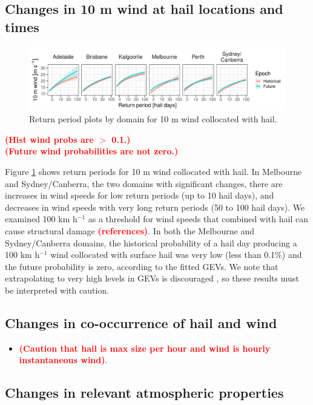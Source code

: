 \documentclass[]{agujournal2019}\usepackage[]{graphicx}\usepackage[]{xcolor}
\newcommand*{\todo}[1]{\textbf{\textcolor{red}{(#1)}}}
\begin{document}
\subsection{Changes in 10 m wind at hail locations and times}

\begin{figure}[!ht]
      \includegraphics[width=\textwidth]{figures/return_periods_wind}
      \caption{Return period plots by domain for 10 m wind collocated with hail.}
      \label{fig:return_periods_wind}
\end{figure}

\noindent\todo{Hist wind probs are $>$ 0.1.}\\\noindent\todo{Future wind probabilities are not zero.}

Figure \ref{fig:return_periods_wind} shows return periods for 10 m wind collocated with hail. In Melbourne and Sydney/Canberra, the two domains with significant changes, there are increases in wind speeds for low return periods (up to 10 hail days), and decreases in wind speeds with very long return periods (50 to 100 hail days). We examined 100 km h$^{-1}$ as a threshold for wind speeds that combined with hail can cause structural damage \todo{references}. In both the Melbourne and Sydney/Canberra domains, the historical probability of a hail day producing a 100 km h$^{-1}$ wind collocated with surface hail was very low (less than 0.1\%) and the future probability is zero, according to the fitted GEVs. We note that extrapolating to very high levels in GEVs is discouraged \cite{Coles_2001}, so these results must be interpreted with caution.

\subsection{Changes in co-occurrence of hail and wind}

\begin{itemize}
\item \todo{Caution that hail is max size per hour and wind is hourly instantaneous wind}.
\end{itemize}

\subsection{Changes in relevant atmospheric properties}
\end{document}
